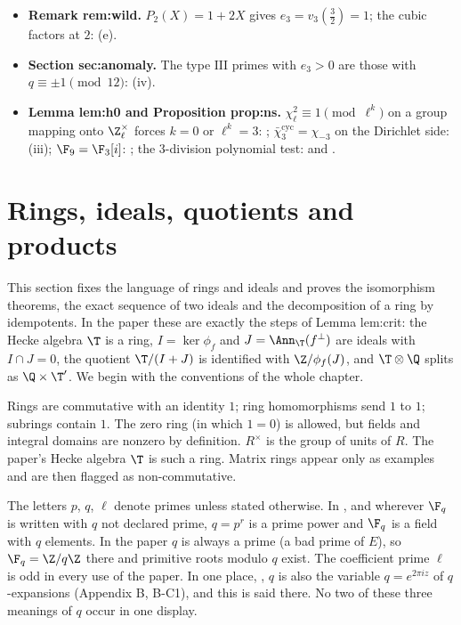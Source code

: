 \begin{itemize}
.
\item \textbf{Remark rem:wild.} $P_2(X)=1+2X$ gives $e_3=v_3(\frac32)=1$; the cubic factors at $2$: (e).
\item \textbf{Section sec:anomaly.} The type $\mathrm{III}$ primes with $e_3>0$ are those with $q\equiv\pm1\pmod{12}$:
(iv).
\item \textbf{Lemma lem:h0 and Proposition prop:ns.} $\chi_\ell^2\equiv1\pmod{\ell^k}$ on a group mapping onto $\Z_\ell^\times$ forces $k=0$ or $\ell^k=3$:
; $\bar\chi_3^{\mathrm{cyc}}=\chi_{-3}$ on the Dirichlet side: (iii); $\F_9=\F_3[i]$:
; the $3$-division polynomial test:  and .
\end{itemize}

\section{Rings, ideals, quotients and products}\label{sec:rings:rings}

This section fixes the language of rings and ideals and proves the isomorphism theorems, the exact sequence of two
ideals and the decomposition of a ring by idempotents. In the paper these are exactly the steps of Lemma lem:crit:
the Hecke algebra $\T$ is a ring, $I=\ker\phi_f$ and $J=\Ann_\T(f^\perp)$ are ideals with $I\cap J=0$, the quotient
$\T/(I+J)$ is identified with $\Z/\phi_f(J)$, and $\T\otimes\Q$ splits as $\Q\times\T'$. We begin with the conventions of
the whole chapter.

\begin{convention}[rings]\label{conv:rings:rings}
Rings are commutative with an identity $1$; ring homomorphisms send $1$ to $1$; subrings contain $1$. The zero ring
(in which $1=0$) is allowed, but fields and integral domains are nonzero by definition. $R^\times$ is the group of units
of $R$. The paper's Hecke algebra $\T$ is such a ring. Matrix rings appear only as examples and are then flagged as
non-commutative.
\end{convention}

\begin{convention}\label{conv:rings:primes}
The letters $p$, $q$, $\ell$ denote primes unless stated otherwise. In ,
and wherever $\F_q$ is written with $q$ not declared prime, $q=p^r$ is a prime power and $\F_q$ is a field with $q$
elements. In the paper $q$ is always a prime (a bad prime of $E$), so $\F_q=\Z/q\Z$ there and primitive roots modulo
$q$ exist. The coefficient prime $\ell$ is odd in every use of the paper. In one place, , $q$ is also
the variable $q=e^{2\pi iz}$ of $q$-expansions (Appendix B, B-C1), and this is said there. No two of these three meanings of $q$
occur in one display.
\end{convention}

